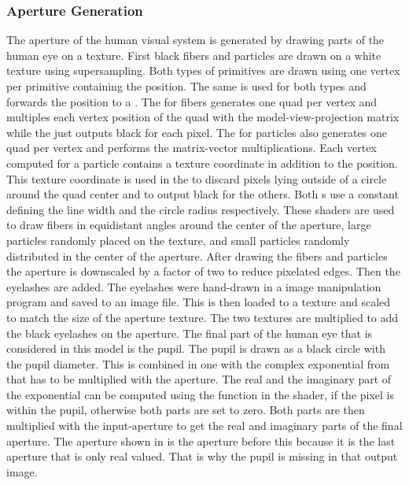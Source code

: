 \subsubsection{Aperture Generation}
The aperture of the human visual system is generated by drawing parts of the human eye on a texture.
%
First black fibers and particles are drawn on a white texture using supersampling.
Both types of primitives are drawn using one vertex per primitive containing the position.
The same \vertexshader{} is used for both types and forwards the position to a .
The  for fibers generates one quad per vertex and multiples each vertex position of the quad with the model\hyp{}view\hyp{}projection matrix while the \pixelshader{} just outputs black for each pixel.
The  for particles also generates one quad per vertex and performs the matrix\hyp{}vector multiplications.
Each vertex computed for a particle contains a texture coordinate in addition to the position.
This texture coordinate is used in the \pixelshader{} to discard pixels lying outside of a circle around the quad center and to output black for the others.
Both s use a constant defining the line width and the circle radius respectively.
These shaders are used to draw fibers in equidistant angles around the center of the aperture, large particles randomly placed on the texture, and small particles randomly distributed in the center of the aperture.
%
After drawing the fibers and particles the aperture is downscaled by a factor of two to reduce pixelated edges.
Then the eyelashes are added.
The eyelashes were hand\hyp{}drawn in a image manipulation program and saved to an image file.
This is then loaded to a texture and scaled to match the size of the aperture texture.
The two textures are multiplied to add the black eyelashes on the aperture.
%
The final part of the human eye that is considered in this model is the pupil.
The pupil is drawn as a black circle with the pupil diameter.
This is combined in one \computeshader{} with the complex exponential from  that has to be multiplied with the aperture.
The real and the imaginary part of the exponential can be computed using the  function in the shader, if the pixel is within the pupil, otherwise both parts are set to zero.
Both parts are then multiplied with the input\hyp{}aperture to get the real and imaginary parts of the final aperture.
%
The aperture shown in  is the aperture before this \computeshader{} because it is the last aperture that is only real valued.
That is why the pupil is missing in that output image.

